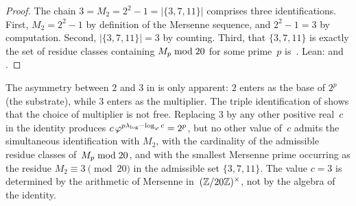 \begin{proof}
The chain $3 = M_{2} = 2^{2}-1 = |\{3,7,11\}|$ comprises three
identifications.  First, $M_{2}=2^{2}-1$ by definition of the Mersenne
sequence, and $2^{2}-1=3$ by computation.  Second,
$|\{3,7,11\}|=3$ by counting.  Third, that $\{3,7,11\}$ is exactly
the set of residue classes containing $M_{p}\bmod 20$ for some
prime~$p$ is~.  Lean:
 and
.
\end{proof}

The asymmetry between $2$ and $3$ in  is only
apparent: $2$ enters as the base of $2^{p}$ (the substrate), while $3$
enters as the multiplier.  The triple identification of
 shows that the choice of multiplier is not free.
Replacing $3$ by any other positive real~$c$ in the identity produces
$c\,\varphi^{p\lambda_{\log}-\log_{\varphi}c}=2^{p}$, but no other value
of~$c$ admits the simultaneous identification with $M_{2}$, with the
cardinality of the admissible residue classes of~$M_{p}\bmod 20$, and with
the smallest Mersenne prime occurring as the residue
$M_{2}\equiv 3\pmod{20}$ in the admissible set $\{3,7,11\}$.  The value
$c=3$ is determined by the arithmetic of Mersenne in~$(\mathbb{Z}/20\mathbb{Z})^{\times}$, not by
the algebra of the identity.

